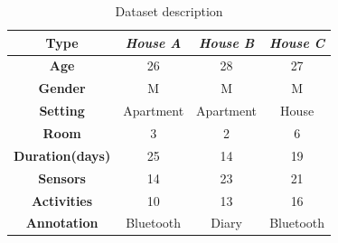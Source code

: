 

%

 
\begin{table}[t!]
\small
\begin{center}
\begin{tabular}{|c|c|c|c|}
\hline
\textbf{Type} & \emph{House A} & \emph{House B} & \emph{House C}\\ \hline
\textbf{Age} & 26 & 28 & 27\\ \hline
\textbf{Gender} & M & M & M\\ \hline
\textbf{Setting} & Apartment & Apartment & House\\ \hline
\textbf{Room} & 3 & 2 & 6\\ \hline
\textbf{Duration(days)} & 25 & 14 & 19\\ \hline
\textbf{Sensors} & 14 & 23 & 21\\ \hline
\textbf{Activities} & 10 & 13 & 16\\ \hline
\textbf{Annotation} & Bluetooth & Diary & Bluetooth\\ \hline
\end{tabular}
\end{center}
\caption{Dataset description}
\label{table:datasets}
\vspace{-0.3cm}
\end{table}




%
%
%
%

